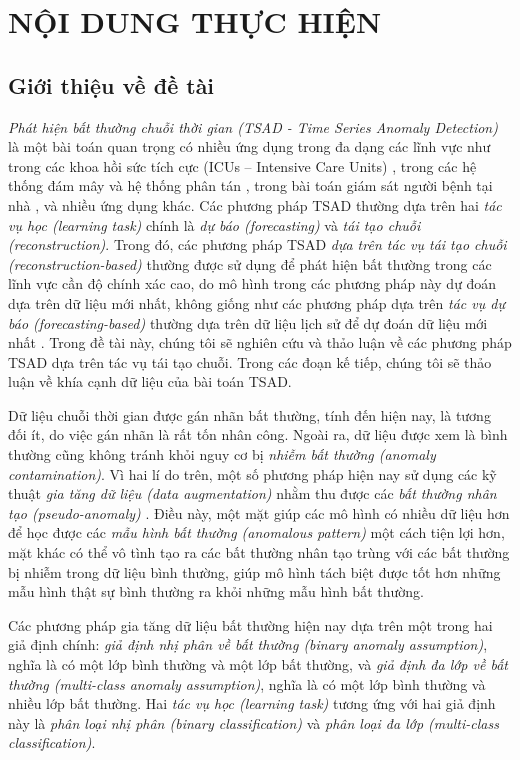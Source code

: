 \section{NỘI DUNG THỰC HIỆN}
{
\subsection{Giới thiệu về đề tài}
\textit{Phát hiện bất thường chuỗi thời gian (TSAD - Time Series Anomaly Detection)} là một bài toán quan trọng có nhiều ứng dụng trong đa dạng các lĩnh vực như trong các khoa hồi sức tích cực (ICUs – Intensive Care Units) \cite{NEURIPS2023_7a53bf4e}, trong các hệ thống đám mây và hệ thống phân tán \cite{10.1145/3746252.3760799}, trong bài toán giám sát người bệnh tại nhà \cite{10.1145/3637528.3671936}, và nhiều ứng dụng khác. Các phương pháp TSAD thường dựa trên hai \textit{tác vụ học (learning task)} chính là \textit{dự báo (forecasting)} và \textit{tái tạo chuỗi (reconstruction)}. Trong đó, các phương pháp TSAD \textit{dựa trên tác vụ tái tạo chuỗi (reconstruction-based)} thường được sử dụng để phát hiện bất thường trong các lĩnh vực cần độ chính xác cao, do mô hình trong các phương pháp này dự đoán dựa trên dữ liệu mới nhất, không giống như các phương pháp dựa trên \textit{tác vụ dự báo (forecasting-based)} thường dựa trên dữ liệu lịch sử để dự đoán dữ liệu mới nhất \cite{10.1145/3691338}. Trong đề tài này, chúng tôi sẽ nghiên cứu và thảo luận về các phương pháp TSAD dựa trên tác vụ tái tạo chuỗi. Trong các đoạn kế tiếp, chúng tôi sẽ thảo luận về khía cạnh dữ liệu của bài toán TSAD.

Dữ liệu chuỗi thời gian được gán nhãn bất thường, tính đến hiện nay, là tương đối ít, do việc gán nhãn là rất tốn nhân công. Ngoài ra, dữ liệu được xem là bình thường cũng không tránh khỏi nguy cơ bị \textit{nhiễm bất thường (anomaly contamination)}. Vì hai lí do trên, một số phương pháp hiện nay sử dụng các kỹ thuật \textit{gia tăng dữ liệu (data augmentation)} nhằm thu được các \textit{bất thường nhân tạo (pseudo-anomaly)} \cite{10.1145/3711896.3737110} \cite{jeong2026pgrfnet} \cite{darban_carla_2025}. Điều này, một mặt giúp các mô hình có nhiều dữ liệu hơn để học được các \textit{mẫu hình bất thường (anomalous pattern)} một cách tiện lợi hơn, mặt khác có thể vô tình tạo ra các bất thường nhân tạo trùng với các bất thường bị nhiễm trong dữ liệu bình thường, giúp mô hình tách biệt được tốt hơn những mẫu hình thật sự bình thường ra khỏi những mẫu hình bất thường.

Các phương pháp gia tăng dữ liệu bất thường hiện nay dựa trên một trong hai giả định chính: \textit{giả định nhị phân về bất thường (binary anomaly assumption)}, nghĩa là có một lớp bình thường và một lớp bất thường, và \textit{giả định đa lớp về bất thường (multi-class anomaly assumption)}, nghĩa là có một lớp bình thường và nhiều lớp bất thường. Hai \textit{tác vụ học (learning task)} tương ứng với hai giả định này là \textit{phân loại nhị phân (binary classification)} và \textit{phân loại đa lớp (multi-class classification)}.

}
